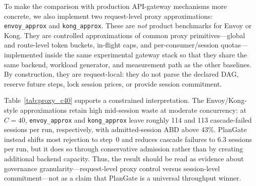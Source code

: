 \documentclass[sigconf,anonymous]{acmart}
\begin{document}
To make the comparison with production API-gateway mechanisms more concrete, we also implement two request-level proxy approximations: \texttt{envoy\_approx} and \texttt{kong\_approx}. These are \emph{not} product benchmarks for Envoy or Kong. They are controlled approximations of common proxy primitives---global and route-level token buckets, in-flight caps, and per-consumer/session quotas---implemented inside the same experimental gateway stack so that they share the same backend, workload generator, and measurement path as the other baselines. By construction, they are request-local: they do not parse the declared DAG, reserve future steps, lock session prices, or provide session commitment.

\begin{table}[h]
\centering
\caption{Envoy/Kong-style proxy approximation baselines at $C{=}40$ (mean over 3 repeats). ABD\% is computed over admitted sessions. Request-level controls can limit traffic, but they do not provide session commitment.}
\label{tab:proxy_c40}
\small
{}
\end{table}

Table~\ref{tab:proxy_c40} supports a constrained interpretation. The Envoy/Kong-style approximations retain high mid-session waste at moderate concurrency: at $C{=}40$, \texttt{envoy\_approx} and \texttt{kong\_approx} leave roughly 114 and 113 cascade-failed sessions per run, respectively, with admitted-session ABD above 43\%. PlanGate instead shifts most rejection to step~0 and reduces cascade failures to 6.3 sessions per run, but it does so through conservative admission rather than by creating additional backend capacity. Thus, the result should be read as evidence about governance granularity---request-level proxy control versus session-level commitment---not as a claim that PlanGate is a universal throughput winner.
\end{document}
